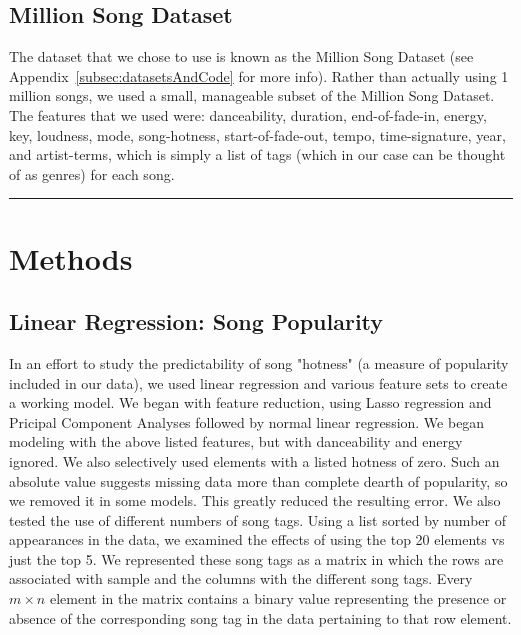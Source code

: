 \documentclass[12pt]{article}
\newcommand{\horizontalLine}{
	\begin{center}
		\hrule width 1.0\textwidth
	\end{center}
}
\begin{document}
\subsection{Million Song Dataset}
\label{subsec:datasetIntro}
The dataset that we chose to use is known as the Million Song Dataset (see Appendix~\ref{subsec:datasetsAndCode} for more info). Rather than actually using 1 million songs, we used a small, manageable subset of the Million Song Dataset. The features that we used were: danceability, duration, end-of-fade-in, energy, key, loudness, mode, song-hotness, start-of-fade-out, tempo, time-signature, year, and artist-terms, which is simply a list of tags (which in our case can be thought of as genres) for each song.

\horizontalLine
\section{Methods}
\label{sec:methods}

\subsection{Linear Regression: Song Popularity}
\label{subsec:linearRegression}
In an effort to study the predictability of song "hotness" (a measure of popularity included in our data), we used linear regression and various feature sets to create a working model. We began with feature reduction, using Lasso regression and Pricipal Component Analyses followed by normal linear regression. We began modeling with the above listed features, but with danceability and energy ignored. We also selectively used elements with a listed hotness of zero. Such an absolute value suggests missing data more than complete dearth of popularity, so we removed it in some models. This greatly reduced the resulting error. We also tested the use of different numbers of song tags. Using a list sorted by number of appearances in the data, we examined the effects of using the top 20 elements vs just the top 5. We represented these song tags as a matrix in which the rows are associated with sample and the columns with the different song tags. Every $m \times n$ element in the matrix contains a binary value representing the presence or absence of the corresponding song tag in the data pertaining to that row element.
\end{document}
